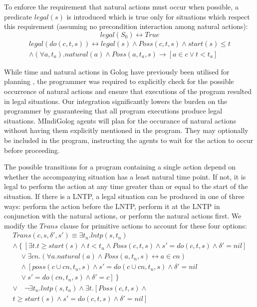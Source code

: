 \documentclass[letterpaper]{article}
\begin{document}
To enforce the requirement that natural actions must occur when possible,
a predicate $legal(s)$ is introduced which is true only for situations
which respect this requirement (assuming no precondition interaction
among natural actions):
\begin{equation}
legal(S_{0}) \leftrightarrow True
\end{equation}
\begin{multline}
legal(do(c,t,s)) \leftrightarrow legal(s)\wedge Poss(c,t,s)\wedge start(s)\leq t\\
\wedge (\forall a,t_{a}).natural(a)\wedge Poss(a,t_{a},s)\rightarrow\left[a\in c\vee t<t_{a}\right]
\end{multline}

While time and natural actions in Golog have previously been utilised
for planning \cite{pirri00planning_nat_acts}, the programmer
was required to explicitly check for the possible occurrence of natural
actions and ensure that executions of the program resulted in legal
situations. Our integration significantly lowers the burden on the
programmer by guaranteeing that all program executions produce legal
situations.
MIndiGolog agents will plan for the occurance of natural actions
without having them explicitly mentioned in the program.  They may
optionally be included in the program, instructing the agents to wait for
the action to occur before proceeding.

The possible transitions for a program containing a single action
depend on whether the accompanying situation has a least natural time
point. If not, it is legal to perform the action at any time greater
than or equal to the start of the situation. If there is a LNTP,
a legal situation can be produced in one of three ways: perform the
action before the LNTP, perform it at the LNTP in conjunction with
the natural actions, or perform the natural actions first.  We modify
the $Trans$ clause for primitive actions to account for these four options:
\begin{multline}
Trans(c,s,\delta',s')\equiv \exists t_{n}. lntp(s,t_{n}) \\
  \wedge \left\{ \left[\exists t.t\geq start(s)\wedge t<t_{n}\wedge Poss(c,t,s)\wedge s'=do(c,t,s)\wedge\delta'=nil\right]\right.\\
   \quad\vee\exists cn.\left(\forall a.natural(a)\wedge Poss(a,t_{n},s)\leftrightarrow a\in cn\right)\\
  \quad\wedge\left[poss(c\cup cn,t_{n},s)\wedge s'=do(c\cup cn,t_{n},s)\wedge\delta'=nil\right.\\
  \quad\vee\left.\left.s'=do(cn,t_{n},s)\wedge\delta'=c\right]\right\}\\
  \vee\quad\neg\exists t_{n}.lntp(s,t_{n})\wedge\exists t.\left[Poss(c,t,s)\wedge\right.\\
  \left.t\geq start(s)\wedge s'=do(c,t,s)\wedge\delta'=nil\right]
\end{multline}
\end{document}
